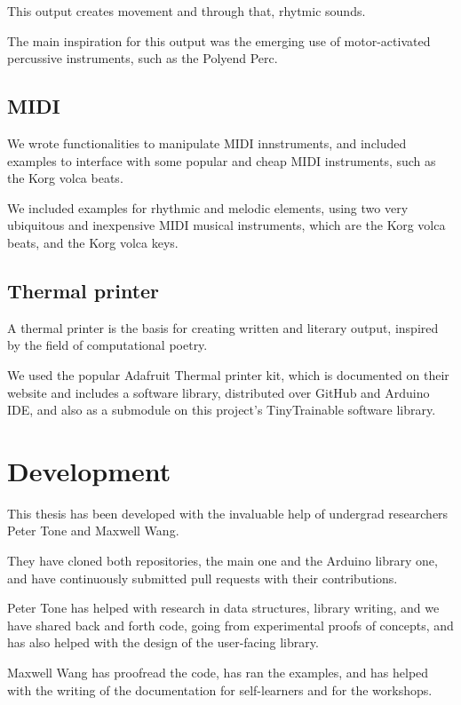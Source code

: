 This output creates movement and through that, rhytmic sounds.

The main inspiration for this output was the emerging use of motor-activated percussive instruments, such as the Polyend Perc.

\subsection{MIDI}

We wrote functionalities to manipulate MIDI innstruments, and included examples to interface with some popular and cheap MIDI instruments, such as the Korg volca beats.

We included examples for rhythmic and melodic elements, using two very ubiquitous and inexpensive MIDI musical instruments, which are the Korg volca beats, and the Korg volca keys.

\subsection{Thermal printer}

A thermal printer is the basis for creating written and literary output, inspired by the field of computational poetry.

We used the popular Adafruit Thermal printer kit, which is documented on their website and includes a software library, distributed over GitHub and Arduino IDE, and also as a submodule on this project's TinyTrainable software library.

\section{Development}

This thesis has been developed with the invaluable help of undergrad researchers Peter Tone and Maxwell Wang.

They have cloned both repositories, the main one and the Arduino library one, and have continuously submitted pull requests with their contributions.

Peter Tone has helped with research in data structures, library writing, and we have shared back and forth code, going from experimental proofs of concepts, and has also helped with the design of the user-facing library.

Maxwell Wang has proofread the code, has ran the examples, and has helped with the writing of the documentation for self-learners and for the workshops.


